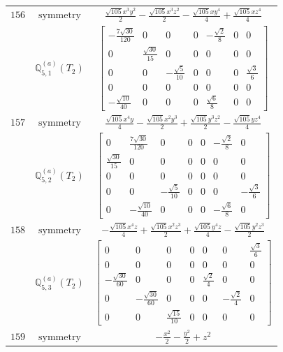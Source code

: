 \documentclass[fleqn,8pt,landscape]{jsarticle}
\begin{document}
\begin{longtable}{ccc}
$ 156 $ & $ \text{symmetry} $ & $ \frac{\sqrt{105} x^{3} y^{2}}{2} - \frac{\sqrt{105} x^{3} z^{2}}{2} - \frac{\sqrt{105} x y^{4}}{4} + \frac{\sqrt{105} x z^{4}}{4} $ \\
$  $ & $ \mathbb{Q}_{5,1}^{(a)}(T_{2}) $ & $ \begin{bmatrix} - \frac{7 \sqrt{30}}{120} & 0 & 0 & 0 & - \frac{\sqrt{2}}{8} & 0 & 0 \\ 0 & \frac{\sqrt{30}}{15} & 0 & 0 & 0 & 0 & 0 \\ 0 & 0 & - \frac{\sqrt{5}}{10} & 0 & 0 & 0 & \frac{\sqrt{3}}{6} \\ 0 & 0 & 0 & 0 & 0 & 0 & 0 \\ - \frac{\sqrt{10}}{40} & 0 & 0 & 0 & \frac{\sqrt{6}}{8} & 0 & 0 \end{bmatrix} $ \\ \hline
$ 157 $ & $ \text{symmetry} $ & $ \frac{\sqrt{105} x^{4} y}{4} - \frac{\sqrt{105} x^{2} y^{3}}{2} + \frac{\sqrt{105} y^{3} z^{2}}{2} - \frac{\sqrt{105} y z^{4}}{4} $ \\
$  $ & $ \mathbb{Q}_{5,2}^{(a)}(T_{2}) $ & $ \begin{bmatrix} 0 & \frac{7 \sqrt{30}}{120} & 0 & 0 & 0 & - \frac{\sqrt{2}}{8} & 0 \\ \frac{\sqrt{30}}{15} & 0 & 0 & 0 & 0 & 0 & 0 \\ 0 & 0 & 0 & 0 & 0 & 0 & 0 \\ 0 & 0 & - \frac{\sqrt{5}}{10} & 0 & 0 & 0 & - \frac{\sqrt{3}}{6} \\ 0 & - \frac{\sqrt{10}}{40} & 0 & 0 & 0 & - \frac{\sqrt{6}}{8} & 0 \end{bmatrix} $ \\ \hline
$ 158 $ & $ \text{symmetry} $ & $ - \frac{\sqrt{105} x^{4} z}{4} + \frac{\sqrt{105} x^{2} z^{3}}{2} + \frac{\sqrt{105} y^{4} z}{4} - \frac{\sqrt{105} y^{2} z^{3}}{2} $ \\
$  $ & $ \mathbb{Q}_{5,3}^{(a)}(T_{2}) $ & $ \begin{bmatrix} 0 & 0 & 0 & 0 & 0 & 0 & \frac{\sqrt{3}}{6} \\ 0 & 0 & 0 & 0 & 0 & 0 & 0 \\ - \frac{\sqrt{30}}{60} & 0 & 0 & 0 & \frac{\sqrt{2}}{4} & 0 & 0 \\ 0 & - \frac{\sqrt{30}}{60} & 0 & 0 & 0 & - \frac{\sqrt{2}}{4} & 0 \\ 0 & 0 & \frac{\sqrt{15}}{10} & 0 & 0 & 0 & 0 \end{bmatrix} $ \\ \hline
$ 159 $ & $ \text{symmetry} $ & $ - \frac{x^{2}}{2} - \frac{y^{2}}{2} + z^{2} $ \\

\end{longtable}
\end{document}
